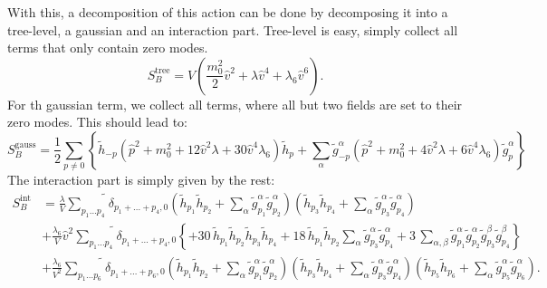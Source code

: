 With this, a decomposition of this action can be done by decomposing it into a tree-level, a gaussian and an interaction part. Tree-level is easy, simply collect
all terms that only contain zero modes. 
\begin{equation}\label{eq:tree_level_action_inBrokenPhase}
 S_B^{\text{tree}} = V \left( \frac{m_0^2}{2} \hat v^2 + \lambda \hat v^4 + \lambda_6 \hat v ^6 \right).
\end{equation}
For th gaussian term, we collect all terms, where all but two fields are set to their zero modes. This should lead to:
\begin{equation}\label{eq:improvedGaussian_action_inBrokenPhase}
 S_B^{\text{gauss}} = \frac{1}{2}\sum\limits_{p \neq 0} \left\{
                 \tilde h_{-p} \left ( \hat p^2 + m_0^2 + 12 \hat v^2 \lambda + 30 \hat v^4 \lambda_6 \right) \tilde h_p
                 + \sum\limits_{\alpha} 
                 \tilde g^{\alpha}_{-p} \left ( \hat p^2 + m_0^2 + 4 \hat v^2 \lambda + 6 \hat v^4 \lambda_6 \right) \tilde g^{\alpha}_p
                 \right\}
\end{equation}
The interaction part is simply given by the rest:
\begin{align}\label{eq:improvedInteraction_action_inBrokenPhase}
 S_B^{\text{int}} & = \frac{\lambda}{V}\widetilde{\sum\limits_{p_1\dots p_4}} \delta_{p_1+ \dots +p_4,0} 
                      \left( \tilde h_{p_1} \tilde h_{p_2} + \sum\limits_{\alpha} \tilde g^{\alpha}_{p_1} \tilde g^{\alpha}_{p_2} \right)
                      \left( \tilde h_{p_3} \tilde h_{p_4} + \sum\limits_{\alpha} \tilde g^{\alpha}_{p_3} \tilde g^{\alpha}_{p_4} \right)
                      \nonumber \\
                  & + \frac{\lambda_6}{V}\hat v^2 \widetilde{\sum\limits_{p_1\dots p_4}} \delta_{p_1+ \dots +p_4,0} \left\{
                    + 30 \, \tilde h_{p_1} \tilde h_{p_2} \tilde h_{p_3} \tilde h_{p_4} 
                    + 18 \, \tilde h_{p_1} \tilde h_{p_2} \sum\limits_{\alpha} \tilde g^{\alpha}_{p_3} \tilde g^{\alpha}_{p_4}
                    + 3  \, \sum\limits_{\alpha,\beta} \tilde g^{\alpha}_{p_1} \tilde g^{\alpha}_{p_2}\tilde g^{\beta}_{p_3} \tilde g^{\beta}_{p_4}
                 \right\}
                      \nonumber \\
                  & + \frac{\lambda_6}{V^2} \widetilde {\sum \limits_{p_1 \dots p_6}} \delta_{p_1+ \dots +p_6,0} 
                \left( \tilde h_{p_1} \tilde h_{p_2} + \sum\limits_{\alpha} \tilde g^{\alpha}_{p_1} \tilde g^{\alpha}_{p_2} \right)
                \left( \tilde h_{p_3} \tilde h_{p_4} + \sum\limits_{\alpha} \tilde g^{\alpha}_{p_3} \tilde g^{\alpha}_{p_4} \right)
                \left( \tilde h_{p_5} \tilde h_{p_6} + \sum\limits_{\alpha} \tilde g^{\alpha}_{p_5} \tilde g^{\alpha}_{p_6} \right).
\end{align}
